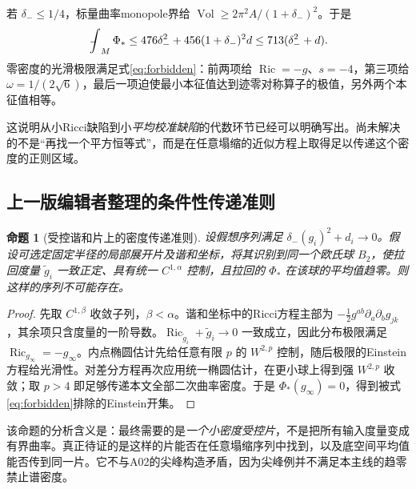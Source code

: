 \documentclass[UTF8,a4paper,11pt,fontset=fandol]{ctexart}
\numberwithin{equation}{section}
\newtheorem{proposition}[theorem]{命题}
\theoremstyle{definition}
\newcommand{\Ric}{\operatorname{Ric}}
\newcommand{\Vol}{\operatorname{Vol}}
\newcommand{\fint}{\mathop{\rlap{\,\raisebox{0.1ex}{\tiny$-$}}\int}\nolimits}
\begin{document}
若 $\delta_-\le1/4$，标量曲率monopole界给 $\Vol\ge2\pi^2A/(1+\delta_-)^2$。于是
\begin{equation}\label{eq:meanPhi}
\fint_M\Phi_*\le476\delta_-^2+456(1+\delta_-)^2d
\le713(\delta_-^2+d).
\end{equation}
零密度的光滑极限满足式\eqref{eq:forbidden}：前两项给 $\Ric=-g$、$s=-4$，第三项给 $\omega=1/(2\sqrt6)$，最后一项迫使最小本征值达到迹零对称算子的极值，另外两个本征值相等。

这说明从小Ricci缺陷到小\emph{平均校准缺陷}的代数环节已经可以明确写出。尚未解决的不是“再找一个平方恒等式”，而是在任意塌缩的近似方程上取得足以传递这个密度的正则区域。


\subsection{上一版编辑者整理的条件性传递准则}
\begin{proposition}[受控谐和片上的密度传递准则]\label{prop:minimalbridge}
设假想序列满足 $\delta_-(g_i)^2+d_i\to0$。假设可选定固定半径的局部展开片及谐和坐标，将其识别到同一个欧氏球 $B_2$，使拉回度量 $\widetilde g_i$ 一致正定、具有统一 $C^{1,\alpha}$ 控制，且拉回的 $\Phi_*$ 在该球的平均值趋零。则这样的序列不可能存在。
\end{proposition}
\begin{proof}
先取 $C^{1,\beta}$ 收敛子列，$\beta<\alpha$。谐和坐标中的Ricci方程主部为 $-\frac12 g^{ab}\partial_a\partial_b g_{jk}$，其余项只含度量的一阶导数。$\Ric_{\widetilde g_i}+\widetilde g_i\to0$ 一致成立，因此分布极限满足 $\Ric_{g_\infty}=-g_\infty$。内点椭圆估计先给任意有限 $p$ 的 $W^{2,p}$ 控制，随后极限的Einstein方程给光滑性。对差分方程再次应用统一椭圆估计，在更小球上得到强 $W^{2,p}$ 收敛；取 $p>4$ 即足够传递本文全部二次曲率密度。于是 $\Phi_*(g_\infty)=0$，得到被式\eqref{eq:forbidden}排除的Einstein开集。
\end{proof}
该命题的分析含义是：最终需要的是\emph{一个小密度受控片}，不是把所有输入度量变成有界曲率。真正待证的是这样的片能否在任意塌缩序列中找到，以及底空间平均值能否传到同一片。它不与A02的尖峰构造矛盾，因为尖峰例并不满足本主线的趋零禁止谱密度。
\end{document}

